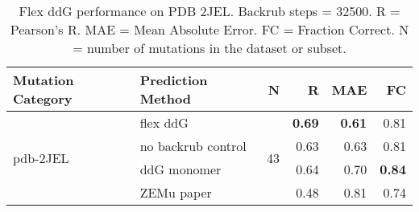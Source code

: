 \begin{table}
  \begin{tabular}{llrrrr}
\toprule
Mutation Category &   Prediction Method &   N &    R &  MAE &   FC \\
\midrule
 \multirow{ 4}{*}{pdb-2JEL} & flex ddG & \multirow{ 4}{*}{43} & \textbf{0.69} & \textbf{0.61} & 0.81  \\
 & no backrub control & & 0.63 & 0.63 & 0.81  \\
 & ddG monomer & & 0.64 & 0.70 & \textbf{0.84}  \\
 & ZEMu paper & & 0.48 & 0.81 & 0.74  \\
\bottomrule
\end{tabular}
  \caption[Flex ddG performance on PDB 2JEL]{
    Flex ddG performance on PDB 2JEL. Backrub steps = 32500. R = Pearson's R. MAE = Mean Absolute Error. FC = Fraction Correct. N = number of mutations in the dataset or subset.
  } \label{tab:table-pdb-2JEL}
\end{table}
